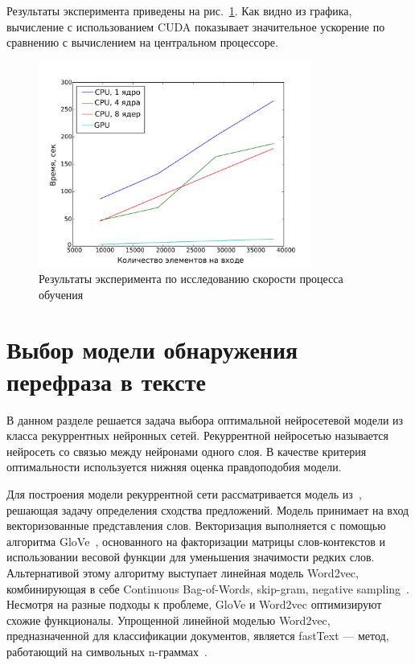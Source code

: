 Результаты эксперимента приведены на рис.~\ref{fig:speed}. Как видно из графика, вычисление с использованием CUDA показывает значительное ускорение по сравнению с вычислением на центральном процессоре.

\begin{figure}[tb!]
 \centering
  \includegraphics[width=0.8\textwidth]{plots/popova/result.pdf}
 \caption{Результаты эксперимента по исследованию скорости процесса обучения}
 \label{fig:speed}
\end{figure}

























\section{Выбор модели обнаружения перефраза в тексте}
В данном разделе решается задача выбора оптимальной нейросетевой модели  из класса рекуррентных нейронных сетей. Рекуррентной нейросетью называется нейросеть со связью между нейронами одного слоя. В качестве критерия оптимальности используется нижняя оценка правдоподобия модели. 

Для построения модели рекуррентной сети рассматривается модель из~\cite{sanborn}, решающая задачу определения сходства предложений.
Модель принимает на вход векторизованные представления слов. Векторизация выполняется с помощью алгоритма GloVe~\cite{glove}, основанного на факторизации матрицы слов-контекстов и использовании весовой функции для уменьшения значимости редких слов. Альтернативой этому алгоритму выступает линейная модель Word2vec, комбинирующая в себе Continuous Bag-of-Words, skip-gram, negative sampling~\cite{word2vec}. Несмотря на разные подходы к проблеме, GloVe и Word2vec оптимизируют схожие функционалы. Упрощенной линейной моделью Word2vec, предназначенной для классификации документов, является fastText --- метод, работающий на символьных n-граммах~\cite{fasttext}. 

